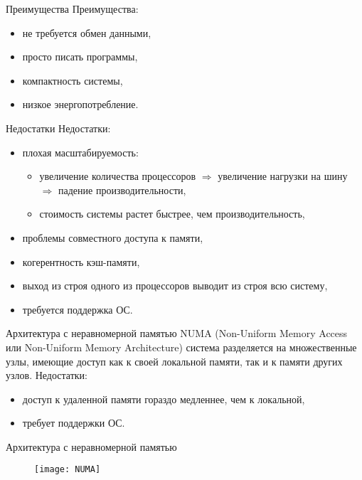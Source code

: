 \begin{frame}{Преимущества}
Преимущества:
\begin{itemize}
    \item не требуется обмен данными,
    \item просто писать программы,
    \item компактность системы,
    \item низкое энергопотребление.
\end{itemize}
\end{frame}

\begin{frame}{Недостатки}
Недостатки:
\begin{itemize}
    \item плохая масштабируемость:
    \begin{itemize}
        \item увеличение количества процессоров $\Rightarrow$ увеличение
        нагрузки на шину $\Rightarrow$ падение производительности,
        \item стоимость системы растет быстрее, чем производительность,
    \end{itemize}
    \item проблемы совместного доступа к памяти,
    \item когерентность кэш-памяти,
    \item выход из строя одного из процессоров выводит из строя всю систему,
    \item требуется поддержка ОС.
\end{itemize}
\end{frame}

\begin{frame}{Архитектура с неравномерной памятью}
NUMA (Non-Uniform Memory Access или Non-Uniform Memory Architecture) система разделяется на множественные узлы, имеющие доступ как к своей локальной памяти, так и к памяти других узлов.
\vfill
Недостатки:
\begin{itemize}
    \item доступ к удаленной памяти гораздо медленнее, чем к локальной,
    \item требует поддержки ОС.
\end{itemize}
\end{frame}

\begin{frame}{Архитектура с неравномерной памятью}
\begin{figure}[htpb]
    \centering
    \texttt{[image: NUMA]}
\end{figure}
\end{frame}

